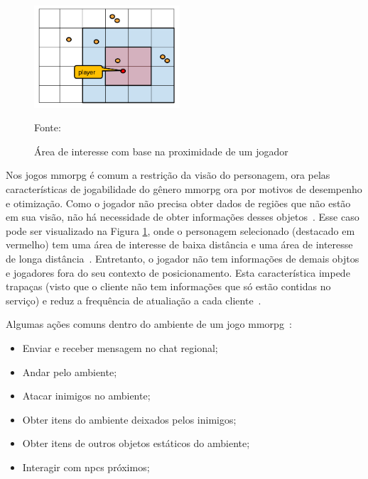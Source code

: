 \begin{figure}[htb!]
\caption{Área de interesse com base na proximidade de um jogador}
\label{fig:proximidade}
\includegraphics[height=3.8cm]{img/cap2/proximidade.png}
\centering

Fonte:~\cite{albion_online_unite}
\end{figure}



Nos jogos \ac{mmorpg} é comum a restrição da visão do personagem, ora pelas características de jogabilidade do gênero \ac{mmorpg} ora por motivos de desempenho e otimização.
%
Como o jogador não precisa obter dados de regiões que não estão em sua visão, não há necessidade de obter informações desses objetos~\cite{albion_online_unite}.
%
Esse caso pode ser visualizado na Figura \ref{fig:proximidade}, onde o personagem selecionado (destacado em vermelho) tem uma área de interesse de baixa distância e uma área de interesse de longa distância~\cite{albion_online_unite}.
%
Entretanto, o jogador não tem informações de demais objtos e jogadores fora do seu contexto de posicionamento.
%
Esta característica impede trapaças (visto que o cliente não tem informações que só estão contidas no serviço) e reduz a frequência de atualiação a cada cliente~\cite{albion_online_unite}.



Algumas ações comuns dentro do ambiente de um jogo \ac{mmorpg}~\cite{mmorpg_culture}:

\begin{itemize}
  \item Enviar e receber mensagem no chat regional;
  \item Andar pelo ambiente;
  \item Atacar inimigos no ambiente;
  \item Obter itens do ambiente deixados pelos inimigos;
  \item Obter itens de outros objetos estáticos do ambiente;
  \item Interagir com \ac{npcs} próximos;
\end{itemize}



